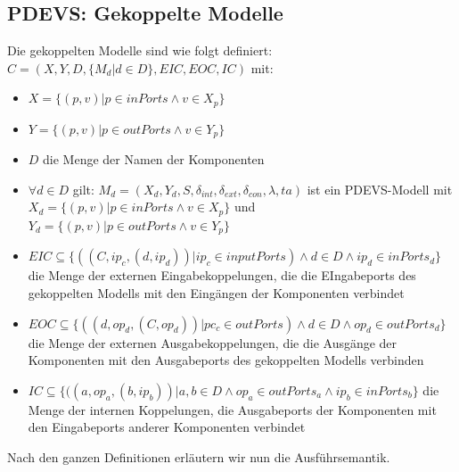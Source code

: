 \documentclass[11pt, fleqn, a4paper, leqno]{scrartcl} %
\begin{document}
	\subsection{PDEVS: Gekoppelte Modelle}
	Die gekoppelten Modelle sind wie folgt definiert: $C = (X,Y,D,\{M_{d}|d \in D\}, EIC,EOC,IC)$ mit:
	\begin{itemize}
		\item $X = \{(p,v)|p \in inPorts \wedge v \in X_{p} \}$
		\item $Y = \{(p,v)|p \in outPorts \wedge v \in Y_{p} \}$
		\item $D$ die Menge der Namen der Komponenten
		\item $\forall d \in D$ gilt: $M_{d} =(X_{d},Y_{d},S,\delta_{int},\delta_{ext},\delta_{con},\lambda,ta)$ ist ein PDEVS-Modell mit $X_{d} = \{(p,v)|p \in inPorts \wedge v \in X_{p}\}$ und $Y_{d} = \{(p,v)|p \in outPorts \wedge v \in Y_{p}\}$
		\item $EIC \subseteq \{((C,ip_{c},(d,ip_{d}))|ip_{c} \in inputPorts) \wedge d \in D \wedge ip_{d}  \in inPorts_{d} \}$ die Menge der externen Eingabekoppelungen, die die EIngabeports des gekoppelten Modells mit den Eingängen der Komponenten verbindet
		\item $EOC \subseteq \{((d,op_{d},(C,op_{d}))|pc_{c} \in outPorts) \wedge d \in D \wedge op_{d}  \in outPorts_{d} \}$ die Menge der externen Ausgabekoppelungen, die die Ausgänge der Komponenten mit den Ausgabeports des gekoppelten Modells verbinden
		\item $IC \subseteq \{((a,op_{a},(b,ip_{b}))|a,b \in D \wedge op_{a}  \in outPorts_{a} \wedge ip_{b} \in inPorts_{b} \}$ die Menge der internen Koppelungen, die Ausgabeports der Komponenten mit den Eingabeports anderer Komponenten verbindet
	\end{itemize}
	Nach den ganzen Definitionen erläutern wir nun die Ausführsemantik.
\end{document}
